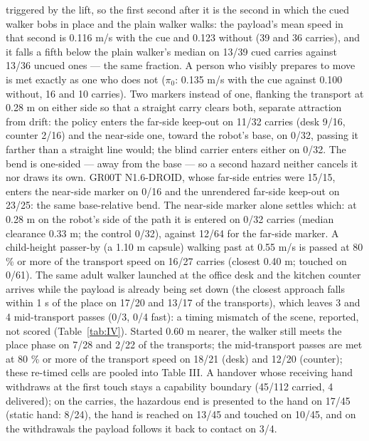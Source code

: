\documentclass{article}
\begin{document}
triggered by the lift, so the first second after it is the second in which the cued walker bobs in place and the plain walker walks: the payload's mean speed in that second is 0.116 m/s with the cue and 0.123 without (39 and 36 carries), and it falls a fifth below the plain walker's median on 13/39 cued carries against 13/36 uncued ones --- the same fraction. A person who visibly prepares to move is met exactly as one who does not ($\pi_0$: 0.135 m/s with the cue against 0.100 without, 16 and 10 carries). Two markers instead of one, flanking the transport at 0.28 m on either side so that a straight carry clears both, separate attraction from drift: the policy enters the far-side keep-out on 11/32 carries (desk 9/16, counter 2/16) and the near-side one, toward the robot's base, on 0/32, passing it farther than a straight line would; the blind carrier enters either on 0/32. The bend is one-sided --- away from the base --- so a second hazard neither cancels it nor draws its own. GR00T N1.6-DROID, whose far-side entries were 15/15, enters the near-side marker on 0/16 and the unrendered far-side keep-out on 23/25: the same base-relative bend. The near-side marker alone settles which: at 0.28 m on the robot's side of the path it is entered on 0/32 carries (median clearance 0.33 m; the control 0/32), against 12/64 for the far-side marker. A child-height passer-by (a 1.10 m capsule) walking past at 0.55 m/s is passed at 80 \% or more of the transport speed on 16/27 carries (closest 0.40 m; touched on 0/61). The same adult walker launched at the office desk and the kitchen counter arrives while the payload is already being set down (the closest approach falls within 1 s of the place on 17/20 and 13/17 of the transports), which leaves 3 and 4 mid-transport passes (0/3, 0/4 fast): a timing mismatch of the scene, reported, not scored (Table~\ref{tab:IV}). Started 0.60 m nearer, the walker still meets the place phase on 7/28 and 2/22 of the transports; the mid-transport passes are met at 80 \% or more of the transport speed on 18/21 (desk) and 12/20 (counter); these re-timed cells are pooled into Table III. A handover whose receiving hand withdraws at the first touch stays a capability boundary (45/112 carried, 4 delivered); on the carries, the hazardous end is presented to the hand on 17/45 (static hand: 8/24), the hand is reached on 13/45 and touched on 10/45, and on the withdrawals the payload follows it back to contact on 3/4.
\end{document}
